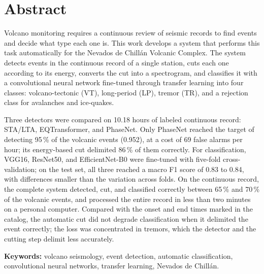 \chapter*{Abstract}

Volcano monitoring requires a continuous review of seismic records to find
events and decide what type each one is. This work develops a system that
performs this task automatically for the Nevados de Chillán Volcanic Complex.
The system detects events in the continuous record of a single station, cuts
each one according to its energy, converts the cut into a spectrogram, and
classifies it with a convolutional neural network fine-tuned through transfer
learning into four classes: volcano-tectonic (VT), long-period (LP), tremor
(TR), and a rejection class for avalanches and ice-quakes.

Three detectors were compared on 10.18 hours of labeled continuous record:
STA/LTA, EQTransformer, and PhaseNet. Only PhaseNet reached the target of
detecting 95\,\% of the volcanic events (0.952), at a cost of 69 false alarms
per hour; its energy-based cut delimited 86\,\% of them correctly. For
classification, VGG16, ResNet50, and EfficientNet-B0 were fine-tuned with
five-fold cross-validation; on the test set, all three reached a macro F1 score
of 0.83 to 0.84, with differences smaller than the variation across folds. On
the continuous record, the complete system detected, cut, and classified
correctly between 65\,\% and 70\,\% of the volcanic events, and processed the
entire record in less than two minutes on a personal computer. Compared with the
onset and end times marked in the catalog, the automatic cut did not degrade
classification when it delimited the event correctly; the loss was
concentrated in tremors, which the detector and the cutting step delimit less
accurately.

\vspace{1cm}
\noindent\textbf{Keywords:} volcano seismology, event detection, automatic
classification, convolutional neural networks, transfer learning, Nevados de
Chillán.
